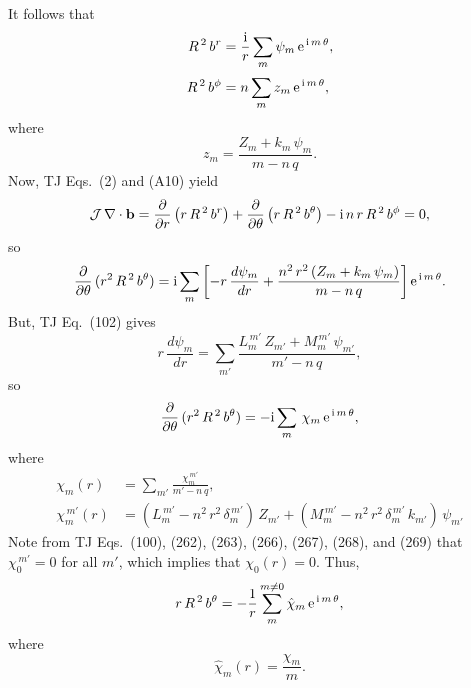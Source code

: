 \documentclass[12pt,prb,aps,notitlepage]{revtex4-1}
\begin{document}
It follows that
\begin{align}
R^{\,2}\,b^r &= \frac{{\rm i}}{r}\sum_m \psi_m\,{\rm e}^{\,{\rm i}\,m \,\theta},\\[0.5ex]
R^{\,2}\,b^\phi &= n\sum_m z_m\,{\rm e}^{\,{\rm i}\,m\,\theta},
\end{align}
where 
\begin{equation}
z_m =  \frac{Z_m+ k_m\,\psi_m}{m-n\,q}.
\end{equation}
Now,  TJ Eqs.~(2) and (A10) yield
\begin{align}
{\cal J}\,\nabla\cdot{\bf b} = \frac{\partial}{\partial r}\left(r\,R^{\,2}\,b^r\right) + \frac{\partial}{\partial \theta}\left(r\,R^{\,2}\,b^\theta\right) - {\rm i}\,n\,r\,R^{\,2}\,b^\phi = 0,
\end{align}
so
\begin{equation}
\frac{\partial}{\partial\theta}\,(r^2\,R^{\,2}\,b^\theta)={\rm i}\sum_m\left[-r\,\frac{d\psi_m}{dr}+ \frac{n^2\,r^2\,(Z_m+k_m\,\psi_m)}{m-n\,q}\right]{\rm e}^{\,{\rm i}\,m\,\theta}.
\end{equation}
But, TJ Eq.~(102) gives
\begin{equation}
r\,\frac{d\psi_m}{dr}=\sum_{m'} \frac{L_{m}^{\,m'}\,Z_{m'} + M_m^{\,m'}\,\psi_{m'}}{m'-n\,q},
\end{equation}
so
\begin{equation}
\frac{\partial}{\partial\theta}\,(r^2\,R^{\,2}\,b^\theta)=-{\rm i}\sum_{m}\,\chi_m\,{\rm e}^{\,{\rm i}\,m\,\theta},
\end{equation}
where
\begin{align}
\chi_m(r)& = \sum_{m'}\frac{\chi_m^{\,m'}}{m'-n\,q},\\[0.5ex]
\chi_m^{\,m'}(r) &= (L_m^{\,m'}- n^2\,r^2\,\delta_m^{\,m'})\,Z_{m'} + (M_m^{\,m'}-n^2\,r^2\,\delta_{m}^{\,m'}\,k_{m'})\,\psi_{m'}
\end{align}
Note from TJ Eqs.~(100), (262), (263), (266), (267), (268), and (269) that $\chi_0^{\,m'}= 0$ for all $m'$, which implies that $\chi_0(r)=0$. 
Thus,
\begin{equation}
r\,R^{\,2}\,b^\theta = -\frac{1}{r}\sum_{m}^{m\neq 0} \hat{\chi}_m\,{\rm e}^{\,{\rm i}\,m\,\theta},
\end{equation}
where 
\begin{equation}
\hat{\chi}_m(r) =\frac{ \chi_m}{m}.
\end{equation} 
\end{document}
